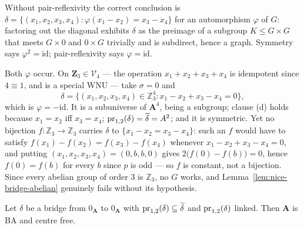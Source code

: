 \begin{remark}\label{rem:phi-twist}
Without pair-reflexivity the correct conclusion is
$\delta=\{(x_{1},x_{2},x_{3},x_{4}):\varphi(x_{1}-x_{2})=x_{3}-x_{4}\}$ for an
automorphism $\varphi$ of $G$: factoring out the diagonal exhibits $\delta$ as
the preimage of a subgroup $K\le G\times G$ that meets $G\times 0$ and
$0\times G$ trivially and is subdirect, hence a graph. Symmetry says
$\varphi^{2}=\mathrm{id}$; pair-reflexivity says $\varphi=\mathrm{id}$.

Both $\varphi$ occur. On $\mathbf Z_{3}\in\mathcal V_{4}$ --- the operation
$x_{1}+x_{2}+x_{3}+x_{4}$ is idempotent since $4\equiv1$, and is a special WNU
--- take $\sigma=0$ and
\[
  \delta=\{(x_{1},x_{2},x_{3},x_{4})\in\mathbb Z_{3}^{4}:
    x_{1}-x_{2}+x_{3}-x_{4}=0\},
\]
which is $\varphi=-\mathrm{id}$. It is a subuniverse of $\mathbf A^{4}$, being
a subgroup; clause (d) holds because $x_{1}=x_{2}$ iff $x_{3}=x_{4}$;
$\operatorname*{pr}_{1,2}(\delta)=\widetilde{\delta}=A^{2}$; and it is symmetric. Yet no bijection
$f\colon\mathbb Z_{3}\to\mathbb Z_{3}$ carries $\delta$ to
$\{x_{1}-x_{2}=x_{3}-x_{4}\}$: such an $f$ would have to satisfy
$f(x_{1})-f(x_{2})=f(x_{3})-f(x_{4})$ whenever $x_{1}-x_{2}+x_{3}-x_{4}=0$, and
putting $(x_{1},x_{2},x_{3},x_{4})=(0,b,b,0)$ gives $2\bigl(f(0)-f(b)\bigr)=0$,
hence $f(0)=f(b)$ for every $b$ since $p$ is odd --- so $f$ is constant, not a
bijection. Since every abelian group of order $3$ is $\mathbb Z_{3}$, no $G$
works, and Lemma~\ref{lem:nice-bridge-abelian} genuinely fails without its
hypothesis.
\end{remark}

\begin{lemma}\label{lem:block-good-bridge}
Let $\delta$ be a bridge from $0_{\mathbf A}$ to $0_{\mathbf A}$ with
$\operatorname*{pr}_{1,2}(\delta)\subseteq\widetilde{\delta}$ and $\operatorname*{pr}_{1,2}(\delta)$ linked.
Then $\mathbf A$ is BA and centre free.
\end{lemma}

